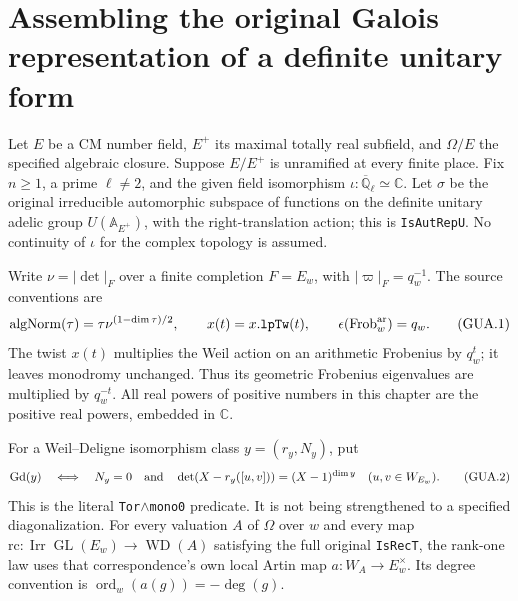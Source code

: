 \section{Assembling the original Galois representation of a definite unitary form}
\label{sec:galois-assembly-v44}


Let $E$ be a CM number field, $E^+$ its maximal totally real
subfield, and $\Omega/E$ the specified algebraic closure.  Suppose
$E/E^+$ is unramified at every finite place.  Fix $n\geq1$, a prime
$\ell\ne2$, and the given field isomorphism
$\iota:\overline{\mathbb Q}_\ell\simeq\mathbb C$.
Let $\sigma$ be the original irreducible automorphic subspace of
functions on the definite unitary adelic group $U(\mathbb A_{E^+})$,
with the right-translation action; this is \texttt{IsAutRepU}.
No continuity of $\iota$ for the complex topology is assumed.

Write $\nu=|\det|_F$ over a finite completion $F=E_w$, with
$|\varpi|_F=q_w^{-1}$.  The source conventions are
\[
 \operatorname{algNorm}(\tau)=\tau\nu^{(1-\dim\tau)/2},\qquad
 x(t)=x.\texttt{lpTw}(t),\qquad
 \epsilon(\operatorname{Frob}^{\rm ar}_w)=q_w.        \tag{GUA.1}
\]
The twist $x(t)$ multiplies the Weil action on an arithmetic
Frobenius by $q_w^t$; it leaves monodromy unchanged.  Thus its
geometric Frobenius eigenvalues are multiplied by $q_w^{-t}$.
All real powers of positive numbers in this chapter are the
positive real powers, embedded in $\mathbb C$.

For a Weil--Deligne isomorphism class $y=(r_y,N_y)$, put
\[
 \operatorname{Gd}(y)\quad\Longleftrightarrow\quad
 N_y=0\quad\hbox{and}\quad
 \det(X-r_y([u,v]))=(X-1)^{\dim y}
                       \quad(u,v\in W_{E_w}).       \tag{GUA.2}
\]
This is the literal \texttt{Tor}$\wedge$\texttt{mono0} predicate.
It is not being strengthened to a specified diagonalization.
For every valuation $A$ of $\Omega$ over $w$ and every map
$\mathrm{rc}:\operatorname{Irr}\operatorname{GL}(E_w)
\longrightarrow\operatorname{WD}(A)$ satisfying the full original
\texttt{IsRecT}, the rank-one law uses that correspondence's own
local Artin map $a:W_A\to E_w^\times$.  Its degree convention is
$\operatorname{ord}_w(a(g))=-\deg(g)$.

